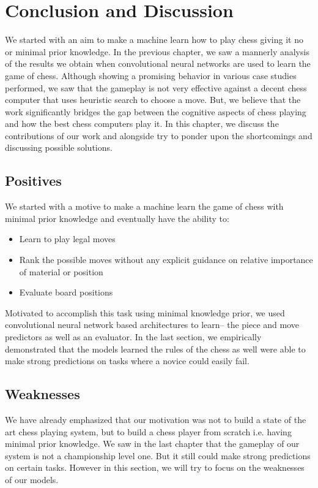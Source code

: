 \chapter{Conclusion and Discussion}

We started with an aim to make a machine learn how to play chess giving it no 
or minimal prior knowledge. In the previous chapter, we saw a mannerly analysis 
of the results we obtain when convolutional neural networks are used to learn 
the game of chess. Although showing a promising behavior in various case 
studies performed, we saw that the gameplay is not very effective against a 
decent chess computer that uses heuristic search to choose a move. But, we 
believe that the work significantly bridges the gap between the cognitive 
aspects of chess playing and how the best chess computers play it. In this 
chapter, we discuss the contributions of our work and alongside try to 
ponder upon the shortcomings and discussing possible solutions.\\

\section{Positives}
We started with a motive to make a machine learn the game of chess with minimal 
prior knowledge and eventually have the ability to:
\begin{itemize}
 \item Learn to play legal moves
 \item Rank the possible moves without any explicit guidance on relative 
importance of material or position
 \item Evaluate board positions
\end{itemize}

Motivated to accomplish this task using minimal knowledge prior, we used 
convolutional neural network based architectures to learn-- the piece and move 
predictors as well as an evaluator. In the last section, we empirically 
demonstrated that the models learned the rules of the chess as well were able 
to make strong predictions on tasks where a novice could easily fail.



\section{Weaknesses}
We have already emphasized that our motivation was not to build a state of the 
art chess playing system, but to build a chess player from 
scratch i.e. having minimal prior knowledge. We saw in the last chapter that 
the gameplay of our system is not a championship level one. But it still could 
make strong predictions on certain tasks. However in this section, we will try 
to focus on the weaknesses of our models.\\

